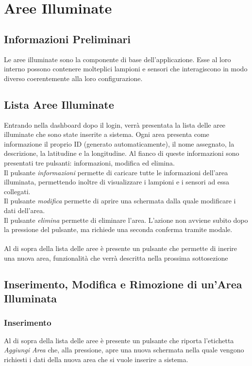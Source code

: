 \documentclass[a4paper, 12pt]{article}
\begin{document}
\newpage
\section{Aree Illuminate}
\subsection{Informazioni Preliminari}
Le aree illuminate sono la componente di base dell'applicazione. Esse al loro interno possono contenere molteplici lampioni e sensori che interagiscono in modo diverso coerentemente alla loro configurazione.
\subsection{Lista Aree Illuminate}
Entrando nella dashboard dopo il login, verrà presentata la lista delle aree illuminate che sono state inserite a sistema. Ogni area presenta come informazione il proprio ID (generato automaticamente), il nome assegnato, la descrizione, la latitudine e la longitudine. Al fianco di queste informazioni sono presentati tre pulsanti: informazioni, modifica ed elimina. \\
Il pulsante \textit{informazioni} permette di caricare tutte le informazioni dell'area illuminata, permettendo inoltre di visualizzare i lampioni e i sensori ad essa collegati.\\
Il pulsante \textit{modifica} permette di aprire una schermata dalla quale modificare i dati dell'area.\\
Il pulsante \textit{elimina} permette di eliminare l'area. L'azione non avviene subito dopo la pressione del pulsante, ma richiede una seconda conferma tramite modale. \\
\\
Al di sopra della lista delle aree è presente un pulsante che permette di inerire una nuova area, funzionalità che verrà descritta nella prossima sottosezione

\subsection{Inserimento, Modifica e Rimozione di un'Area Illuminata}
\subsubsection{Inserimento}
Al di sopra della lista delle aree è presente un pulsante che riporta l'etichetta \textit{Aggiungi Area} che, alla pressione, apre una nuova schermata nella quale vengono richiesti i dati della nuova area che si vuole inserire a sistema.
\end{document}
